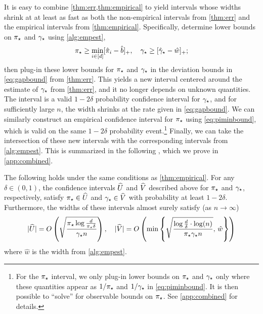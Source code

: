 It is easy to combine \cref{thm:err,thm:empirical} to yield intervals
whose widths shrink at at least as fast as both the non-empirical
intervals from \cref{thm:err} and the empirical intervals from
\cref{thm:empirical}.
Specifically, determine lower bounds on $\pi_{\star}$ and $\gamma_{\star}$ using
\cref{alg:empest},
\[
  \pi_{\star} \geq \min_{i \in [d]} [ \hat\pi_i - \hat{b} ]_+
  , \quad
  \gamma_{\star} \geq [ \hat\gamma_{\star} - \hat{w} ]_+
  ;
\]
then plug-in these lower bounds for $\pi_{\star}$ and $\gamma_{\star}$ in the
deviation bounds in \cref{eq:gapbound} from \cref{thm:err}.
This yields a new interval centered around the estimate of $\gamma_{\star}$ from
\cref{thm:err}, and it no longer depends on unknown quantities.
The interval is a valid $1-2\delta$ probability confidence interval
for $\gamma_{\star}$, and for sufficiently large $n$, the width shrinks at the
rate given in \cref{eq:gapbound}.
We can similarly construct an empirical confidence interval for
$\pi_{\star}$ using \cref{eq:piminbound}, which is valid on the same
$1-2\delta$ probability event.\footnote{%
  For the $\pi_{\star}$ interval, we only plug-in lower bounds on $\pi_{\star}$
  and $\gamma_{\star}$ only where these quantities appear as $1/\pi_{\star}$ and
  $1/\gamma_{\star}$ in \cref{eq:piminbound}.
  It is then possible to ``solve'' for observable bounds on $\pi_{\star}$.
  See \cref{app:combined} for details.%
}
Finally, we can take the intersection of these new intervals with the
corresponding intervals from \cref{alg:empest}.
This is summarized in the following , which
we prove in \cref{app:combined}.
\begin{theorem}
  \label{thm:combined}
  The following holds under the same conditions as
  \cref{thm:empirical}.
  For any $\delta \in (0,1)$, the confidence intervals $\widehat{U}$ and
  $\widehat{V}$ described above for $\pi_{\star}$ and $\gamma_{\star}$, respectively,
  satisfy $\pi_{\star} \in \widehat{U}$ and $\gamma_{\star} \in \widehat{V}$ with probability
  at least $1-2\delta$.
  Furthermore, the widths of these intervals almost surely satisfy
  (as $n \to \infty$) 
  \[
    |\widehat{U}|
    =
    O\left(
      \sqrt{\frac{\pi_{\star}\log\frac{d}{\pi_{\star}\delta}}{\gamma_{\star} n}}
    \right)
    ,
    \quad
    |\widehat{V}|
    =
    O\left(
      \min\left\{
        \sqrt{\frac{\log\frac{d}{\delta}\cdot\log(n)}{\pi_{\star}\gamma_{\star} n}}
        ,\,
        \hat{w}
      \right\}
    \right)
  \]
  where $\hat{w}$ is the width from \cref{alg:empest}.
\end{theorem}


